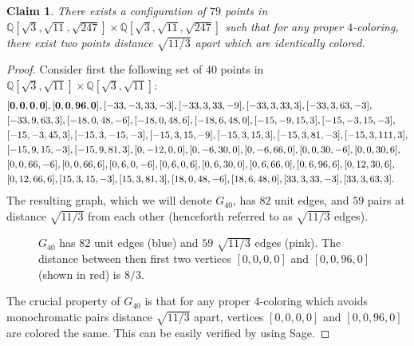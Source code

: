 \documentclass [11pt,oneside]{amsart}
\theoremstyle{definition}
\theoremstyle{plain}
\newtheorem{claim}[df]{Claim}
\begin{document}
\begin{claim}\label{Claim1}
There exists a configuration of $79$ points in $\mathbb{Q}[\sqrt{3}, \sqrt{11},\sqrt{247}]\times \mathbb{Q}[\sqrt{3}, \sqrt{11},\sqrt{247}]$ such that for any proper $4$-coloring, there exist two points distance $\sqrt{11/3}$ apart which are identically colored.
\end{claim}
\begin{proof}
Consider first the following set of $40$ points in $\mathbb{Q}[\sqrt{3}, \sqrt{11}]\times \mathbb{Q}[\sqrt{3}, \sqrt{11}]$:
{
\begin{align*}
&{\bf [0, 0, 0, 0], [0, 0, 96, 0]}, [-33, -3, 33, -3], [-33, 3, 33, -9], [-33, 3, 33, 3], [-33, 3, 63, -3],\\
&[-33, 9, 63, 3],[-18, 0, 48, -6], [-18, 0, 48, 6], [-18, 6, 48, 0], [-15, -9, 15, 3], [-15, -3, 15, -3],\\
&[-15, -3, 45, 3], [-15, 3, -15, -3], [-15, 3, 15, -9], [-15, 3, 15, 3], [-15, 3, 81, -3], [-15, 3, 111, 3],\\
&[-15, 9, 15, -3], [-15, 9, 81, 3], [0, -12, 0, 0], [0, -6, 30, 0], [0, -6, 66, 0], [0, 0, 30, -6], [0, 0, 30, 6],\\
&[0, 0, 66, -6], [0, 0, 66, 6], [0, 6, 0, -6], [0, 6, 0, 6], [0, 6, 30, 0], [0, 6, 66, 0], [0, 6, 96, 6], [0, 12, 30, 6],\\
&[0, 12, 66, 6], [15, 3, 15, -3], [15, 3, 81, 3], [18, 0, 48, -6], [18, 6, 48, 0], [33, 3, 33, -3], [33, 3, 63, 3].
\end{align*}
}
The resulting graph, which we will denote $G_{40}$, has $82$ unit edges, and $59$ pairs at distance $\sqrt{11/3}$ from each other (henceforth referred to as $\sqrt{11/3}$ edges).

\begin{figure}[ht]
\centering
{}
\caption{$G_{40}$ has $82$ unit edges (blue) and $59$ $\sqrt{11/3}$ edges (pink). The distance between then first two vertices $[0,0,0,0]$ and $[0,0,96,0]$ (shown in red) is $8/3$.}
\label{G40drawing}
\end{figure}

The crucial property of $G_{40}$ is that for any proper $4$-coloring which avoids monochromatic pairs distance $\sqrt{11/3}$ apart,  vertices $[0,0,0,0]$ and $[0,0,96,0]$ are colored the same. This can be easily verified by using Sage.


\end{proof}
\end{document}
